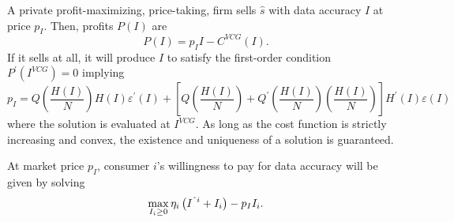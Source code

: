 \documentclass[landscape]{baposter}
\begin{document}
\begin{poster}
{A private profit-maximizing, price-taking, firm sells $\hat{s}$ with data accuracy $I$ at price $p_{I}$. Then, profits $P\left( I\right) $ are%
\begin{equation*}
    P\left( I\right) =p_{I}I-C^{VCG}(I).
\end{equation*}%
If it sells at all, it will produce $I$ to satisfy the first-order condition
$P^{\prime }\left( I^{VCG}\right) =0$ implying%
\begin{equation}
    p_{I}=Q\left( \frac{H(I)}{N}\right) H(I)\varepsilon ^{\prime }(I)+\left[
    Q\left( \frac{H(I)}{N}\right) +Q^{\prime }\left( \frac{H(I)}{N}\right)
    \left( \frac{H(I)}{N}\right) \right] H^{\prime }(I)\varepsilon (I)
    \label{eq:p_private}
\end{equation}%
where the solution is evaluated at $I^{VCG}$. %
As long as the cost function is strictly increasing and convex,
the existence and uniqueness of a solution is guaranteed. 

At market price $p_{I}$, consumer $i$'s willingness to pay for data accuracy will be given by solving%
\begin{equation*}
    \max_{I_{i}\geq 0}\eta _{i}\left( I^{\symbol{126}i}+I_{i}\right) -p_{I}I_{i}.
\end{equation*} 


}
\end{poster}
\end{document}
